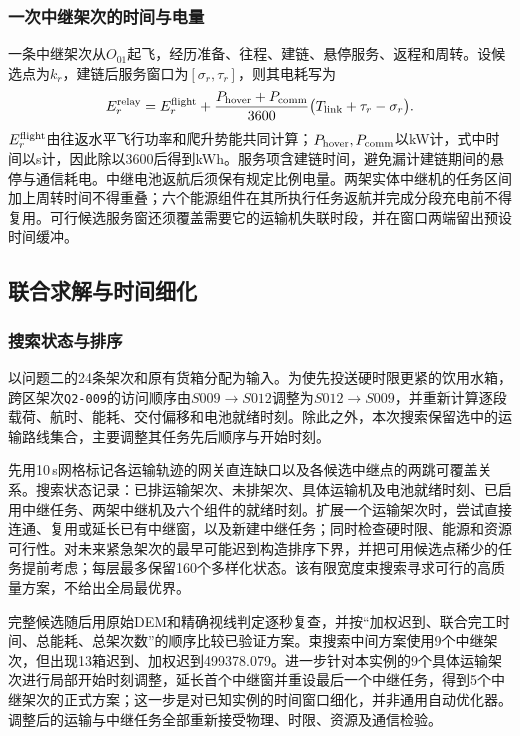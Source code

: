 \documentclass[bwprint,fontset=fandol]{gmcmthesis}
\begin{document}
\subsubsection{一次中继架次的时间与电量}
一条中继架次从$O_{01}$起飞，经历准备、往程、建链、悬停服务、返程和周转。设候选点为$k_r$，建链后服务窗口为$[\sigma_r,\tau_r]$，则其电耗写为
\begin{equation}
E_r^{\rm relay}=E_r^{\rm flight}
+\frac{P_{\rm hover}+P_{\rm comm}}{3600}
\bigl(T_{\rm link}+\tau_r-\sigma_r\bigr).
\label{eq:q3-relay-energy}
\end{equation}
$E_r^{\rm flight}$由往返水平飞行功率和爬升势能共同计算；$P_{\rm hover},P_{\rm comm}$以kW计，式中时间以s计，因此除以3600后得到kWh。服务项含建链时间，避免漏计建链期间的悬停与通信耗电。中继电池返航后须保有规定比例电量。两架实体中继机的任务区间加上周转时间不得重叠；六个能源组件在其所执行任务返航并完成分段充电前不得复用。可行候选服务窗还须覆盖需要它的运输机失联时段，并在窗口两端留出预设时间缓冲。

\subsection{联合求解与时间细化}
\subsubsection{搜索状态与排序}
以问题二的24条架次和原有货箱分配为输入。为使先投送硬时限更紧的饮用水箱，跨区架次\texttt{Q2-009}的访问顺序由$S009\to S012$调整为$S012\to S009$，并重新计算逐段载荷、航时、能耗、交付偏移和电池就绪时刻。除此之外，本次搜索保留选中的运输路线集合，主要调整其任务先后顺序与开始时刻。

先用10\,s网格标记各运输轨迹的网关直连缺口以及各候选中继点的两跳可覆盖关系。搜索状态记录：已排运输架次、未排架次、具体运输机及电池就绪时刻、已启用中继任务、两架中继机及六个组件的就绪时刻。扩展一个运输架次时，尝试直接连通、复用或延长已有中继窗，以及新建中继任务；同时检查硬时限、能源和资源可行性。对未来紧急架次的最早可能迟到构造排序下界，并把可用候选点稀少的任务提前考虑；每层最多保留160个多样化状态。该有限宽度束搜索寻求可行的高质量方案，不给出全局最优界。

完整候选随后用原始DEM和精确视线判定逐秒复查，并按“加权迟到、联合完工时间、总能耗、总架次数”的顺序比较已验证方案。束搜索中间方案使用9个中继架次，但出现13箱迟到、加权迟到499378.079。进一步针对本实例的9个具体运输架次进行局部开始时刻调整，延长首个中继窗并重设最后一个中继任务，得到5个中继架次的正式方案；这一步是对已知实例的时间窗口细化，并非通用自动优化器。调整后的运输与中继任务全部重新接受物理、时限、资源及通信检验。
\end{document}

